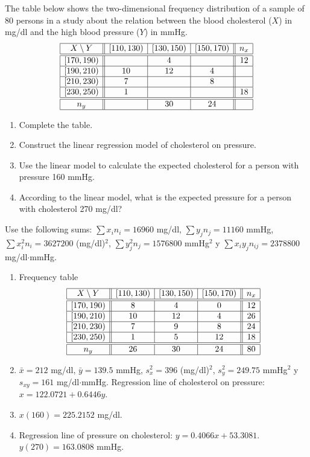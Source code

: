 {The table below shows the two-dimensional frequency distribution of a sample of 80 persons in a study about the
relation between the blood cholesterol ($X$) in mg/dl and the high blood pressure ($Y$) in mmHg.
\[
\begin{array}{|c||c|c|c||c|}
\hline
X\setminus Y & [110,130) & [130,150) & [150,170) & n_x \\
\hline\hline
[170,190)   &           &     4     &           & 12\\
\hline
[190,210)   &    10     &    12     &     4     &   \\
\hline
[210,230)   &     7     &           &     8     &   \\
\hline
[230,250)   &     1     &           &           & 18\\
\hline\hline
n_y          &           &    30     &    24    &    \\
\hline
\end{array}
\]

\begin{enumerate}
\item Complete the table.
\item Construct the linear regression model of cholesterol on pressure.
\item Use the linear model to calculate the expected cholesterol for a person with pressure 160 mmHg.
\item According to the linear model, what is the expected pressure for a person with cholesterol 270 mg/dl?
\end{enumerate}

Use the following sums:
$\sum x_in_i=16960$ mg/dl, $\sum y_jn_j=11160$ mmHg, $\sum x_i^2n_i=3627200$ (mg/dl)$^2$, $\sum y_j^2n_j=1576800$ mmHg$^2$ y
$\sum x_iy_jn_{ij}=2378800$ mg/dl$\cdot$mmHg.
}
{
\begin{enumerate}
\item Frequency table
\[
\begin{array}{|c||c|c|c||c|}
\hline
X\setminus Y & [110,130) & [130,150) & [150,170) & n_x \\
\hline\hline
[170,190)   &     8     &     4     &     0     & 12 \\
\hline
[190,210)   &    10     &    12     &     4     & 26 \\
\hline
[210,230)   &     7     &     9     &     8     & 24 \\
\hline
[230,250)   &     1     &     5     &    12     & 18 \\
\hline\hline
n_y          &   26     &    30     &    24     & 80 \\
\hline
\end{array}
\]
\item $\bar x=212$ mg/dl, $\bar y=139.5$ mmHg, $s_x^2=396$ (mg/dl)$^2$, $s_y^2=249.75$ mmHg$^2$ y $s_{xy}=161$
mg/dl$\cdot$mmHg. Regression line of cholesterol on pressure: $x=122.0721+0.6446y$.
\item  $x(160)=225.2152$ mg/dl.
\item Regression line of pressure on cholesterol: $y=0.4066x+53.3081$.\\
$y(270)=163.0808$ mmHg.
\end{enumerate}
}
{}


